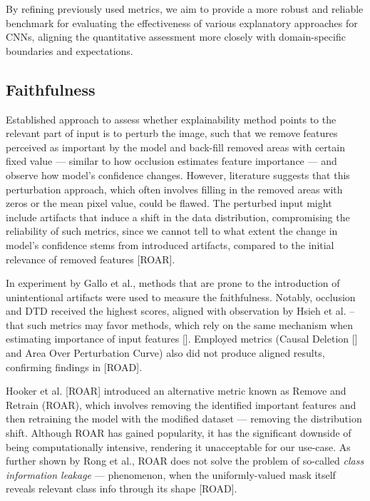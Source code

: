 By refining previously used metrics, we aim to provide a more robust and reliable benchmark for evaluating the effectiveness of various explanatory approaches for CNNs, aligning the quantitative assessment more closely with domain-specific boundaries and expectations.

\subsection*{Faithfulness}

Established approach to assess whether explainability method points to the relevant part of input is to perturb the image, such that we remove features perceived as important by the model and back-fill removed areas with certain fixed value --- similar to how occlusion estimates feature importance --- and observe how model's confidence changes. However, literature suggests that this perturbation approach, which often involves filling in the removed areas with zeros or the mean pixel value, could be flawed. The perturbed input might include artifacts that induce a shift in the data distribution, compromising the reliability of such metrics, since we cannot tell to what extent the change in model's confidence stems from introduced artifacts, compared to the initial relevance of removed features [ROAR].

In experiment by Gallo et al., methods that are prone to the introduction of unintentional artifacts were used to measure the faithfulness. Notably, occlusion and DTD received the highest scores, aligned with observation by Hsieh et al. -- that such metrics may favor methods, which rely on the same mechanism when estimating importance of input features []. Employed metrics (Causal Deletion [] and Area Over Perturbation Curve) also did not produce aligned results, confirming findings in [ROAD].

Hooker et al. [ROAR] introduced an alternative metric known as Remove and Retrain (ROAR), which involves removing the identified important features and then retraining the model with the modified dataset --- removing the distribution shift. Although ROAR has gained popularity, it has the significant downside of being computationally intensive, rendering it unacceptable for our use-case. As further shown by Rong et al., ROAR does not solve the problem of so-called \emph{class information leakage} --- phenomenon, when the uniformly-valued mask itself reveals relevant class info through its shape [ROAD].

